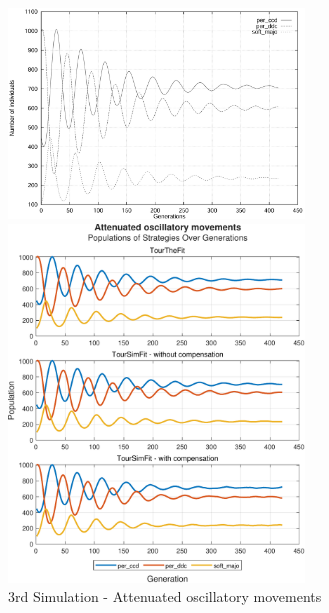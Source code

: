 \documentclass[12pt]{article}
\begin{document}
	\begin{figure}[h]
	    \centering
		\includegraphics[width=0.7\textwidth]{RefPaperFigures/fig3.jpeg}\par\vspace{0.5em}
	    \includegraphics[width=0.7\textwidth]{Attenuated oscillatory movements.pdf}
	    \caption{3rd Simulation - Attenuated oscillatory movements}
	    \label{fig:Attenuated oscillatory movements}
	\end{figure}
\end{document}
